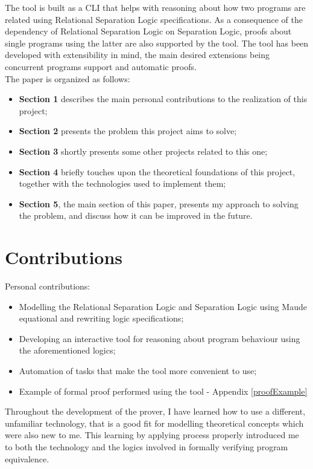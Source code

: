 \documentclass[12pt,a4paper]{article}
\begin{document}
The tool is built as a CLI that helps with reasoning about how two programs are related using Relational Separation Logic specifications. As a consequence of the dependency of Relational Separation Logic on Separation Logic, proofs about single programs using the latter are also supported by the tool. The tool has been developed with extensibility in mind, the main desired extensions being concurrent programs support and automatic proofs. \\

The paper is organized as follows: 
\begin{itemize}
	\item {\textbf{Section 1} describes the main personal contributions to the realization of this project;}
	\item {\textbf{Section 2} presents the problem this project aims to solve;}
	\item {\textbf{Section 3} shortly presents some other projects related to this one;}
	\item {\textbf{Section 4} briefly touches upon the theoretical foundations of this project, together with the technologies used to implement them;}
	\item {\textbf{Section 5}, the main section of this paper, presents my approach to solving the problem, and discuss how it can be improved in the future.}
\end{itemize}
\section{Contributions}
Personal contributions:
\begin{itemize}
	\item Modelling the Relational Separation Logic and Separation Logic using Maude equational and rewriting logic specifications; 
	\item Developing an interactive tool for reasoning about program behaviour using the aforementioned logics;
	\item Automation of tasks that make the tool more convenient to use;
	\item Example of formal proof performed using the tool - Appendix \ref{proofExample}
\end{itemize}
Throughout the development of the prover, I have learned how to use a different, unfamiliar technology, that is a good fit for  modelling theoretical concepts which were also new to me. This learning by applying process properly introduced me to both the technology and the logics involved in formally verifying program equivalence. 
\end{document}
